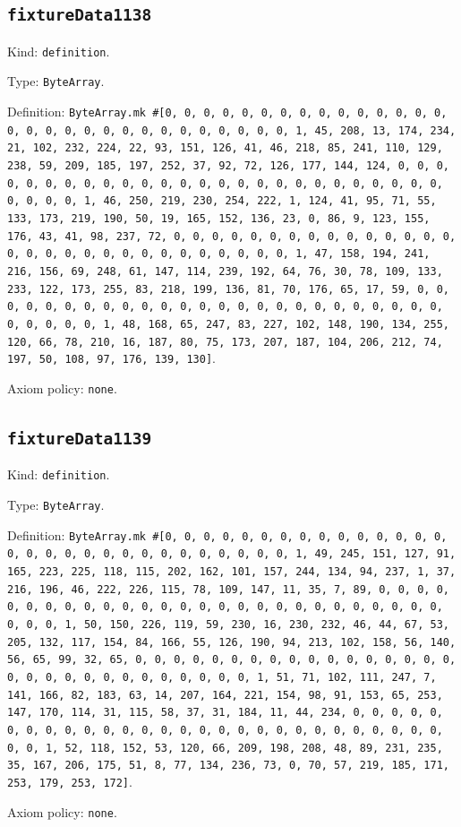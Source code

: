 \documentclass[11pt]{article}
\begin{document}
\subsection*{\texttt{fixtureData1138}}
\noindent Kind: \texttt{definition}.\par
\noindent Type: \texttt{ByteArray}.\par
\noindent Definition: \texttt{ByteArray.mk \#[0, 0, 0, 0, 0, 0, 0, 0, 0, 0, 0, 0, 0, 0, 0, 0, 0, 0, 0, 0, 0, 0, 0, 0, 0, 0, 0, 0, 0, 0, 1, 45, 208, 13, 174, 234, 21, 102, 232, 224, 22, 93, 151, 126, 41, 46, 218, 85, 241, 110, 129, 238, 59, 209, 185, 197, 252, 37, 92, 72, 126, 177, 144, 124, 0, 0, 0, 0, 0, 0, 0, 0, 0, 0, 0, 0, 0, 0, 0, 0, 0, 0, 0, 0, 0, 0, 0, 0, 0, 0, 0, 0, 0, 0, 1, 46, 250, 219, 230, 254, 222, 1, 124, 41, 95, 71, 55, 133, 173, 219, 190, 50, 19, 165, 152, 136, 23, 0, 86, 9, 123, 155, 176, 43, 41, 98, 237, 72, 0, 0, 0, 0, 0, 0, 0, 0, 0, 0, 0, 0, 0, 0, 0, 0, 0, 0, 0, 0, 0, 0, 0, 0, 0, 0, 0, 0, 0, 0, 1, 47, 158, 194, 241, 216, 156, 69, 248, 61, 147, 114, 239, 192, 64, 76, 30, 78, 109, 133, 233, 122, 173, 255, 83, 218, 199, 136, 81, 70, 176, 65, 17, 59, 0, 0, 0, 0, 0, 0, 0, 0, 0, 0, 0, 0, 0, 0, 0, 0, 0, 0, 0, 0, 0, 0, 0, 0, 0, 0, 0, 0, 0, 0, 1, 48, 168, 65, 247, 83, 227, 102, 148, 190, 134, 255, 120, 66, 78, 210, 16, 187, 80, 75, 173, 207, 187, 104, 206, 212, 74, 197, 50, 108, 97, 176, 139, 130]}.\par
\noindent Axiom policy: \texttt{none}.\par
\subsection*{\texttt{fixtureData1139}}
\noindent Kind: \texttt{definition}.\par
\noindent Type: \texttt{ByteArray}.\par
\noindent Definition: \texttt{ByteArray.mk \#[0, 0, 0, 0, 0, 0, 0, 0, 0, 0, 0, 0, 0, 0, 0, 0, 0, 0, 0, 0, 0, 0, 0, 0, 0, 0, 0, 0, 0, 0, 1, 49, 245, 151, 127, 91, 165, 223, 225, 118, 115, 202, 162, 101, 157, 244, 134, 94, 237, 1, 37, 216, 196, 46, 222, 226, 115, 78, 109, 147, 11, 35, 7, 89, 0, 0, 0, 0, 0, 0, 0, 0, 0, 0, 0, 0, 0, 0, 0, 0, 0, 0, 0, 0, 0, 0, 0, 0, 0, 0, 0, 0, 0, 0, 1, 50, 150, 226, 119, 59, 230, 16, 230, 232, 46, 44, 67, 53, 205, 132, 117, 154, 84, 166, 55, 126, 190, 94, 213, 102, 158, 56, 140, 56, 65, 99, 32, 65, 0, 0, 0, 0, 0, 0, 0, 0, 0, 0, 0, 0, 0, 0, 0, 0, 0, 0, 0, 0, 0, 0, 0, 0, 0, 0, 0, 0, 0, 0, 1, 51, 71, 102, 111, 247, 7, 141, 166, 82, 183, 63, 14, 207, 164, 221, 154, 98, 91, 153, 65, 253, 147, 170, 114, 31, 115, 58, 37, 31, 184, 11, 44, 234, 0, 0, 0, 0, 0, 0, 0, 0, 0, 0, 0, 0, 0, 0, 0, 0, 0, 0, 0, 0, 0, 0, 0, 0, 0, 0, 0, 0, 0, 0, 1, 52, 118, 152, 53, 120, 66, 209, 198, 208, 48, 89, 231, 235, 35, 167, 206, 175, 51, 8, 77, 134, 236, 73, 0, 70, 57, 219, 185, 171, 253, 179, 253, 172]}.\par
\noindent Axiom policy: \texttt{none}.\par
\end{document}
